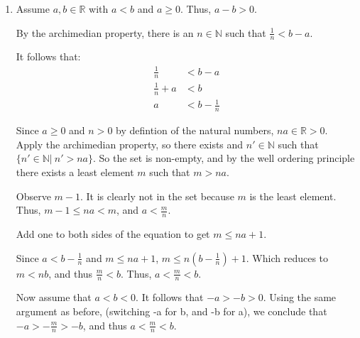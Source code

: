 \documentclass{article}
\theoremstyle{problem}
\theoremstyle{plain}
\theoremstyle{remark}
\begin{document}
\begin{enumerate}
\item 
  Assume $a,b \in \mathbb{R}$ with $a < b$ and $a \geq 0$. Thus, $a - b > 0$.

  By the archimedian property, there is an $n \in \mathbb{N}$ such that $\frac{1}{n} < b - a$.

  It follows that:
  \begin{align*}
    \frac{1}{n} &< b - a\\
    \frac{1}{n} + a &< b\\
    a &< b - \frac{1}{n}
  \end{align*}

  Since $a \geq 0$ and $n > 0$ by defintion of the natural numbers, $na \in \mathbb{R} > 0$.  
  Apply the archimedian property, so there exists and $n' \in \mathbb{N}$ such that $\{n' \in \mathbb{N}|\ n' > na \}$.
  So the set is non-empty, and by the well ordering principle there exists a least element $m$ such that $m > na$.

  Observe $m - 1$. It is clearly not in the set because $m$ is the least element.
  Thus, $m - 1 \leq na < m$, and $a < \frac{m}{n}$.

  Add one to both sides of the equation to get $m \leq na + 1$.

  Since $a < b - \frac{1}{n}$ and $m \leq na + 1$, $m \leq n(b - \frac{1}{n}) + 1$.
  Which reduces to $m < nb$, and thus $\frac{m}{n} < b$.
  Thus, $a < \frac{m}{n} < b$.

  Now assume that $a < b < 0$.
  It follows that $-a > -b > 0$.
  Using the same argument as before, (switching -a for b, and -b for a), we conclude that $-a > -\frac{m}{n} > -b$, and thus $a < \frac{m}{n} < b$.
  

\end{enumerate}
\end{document}

